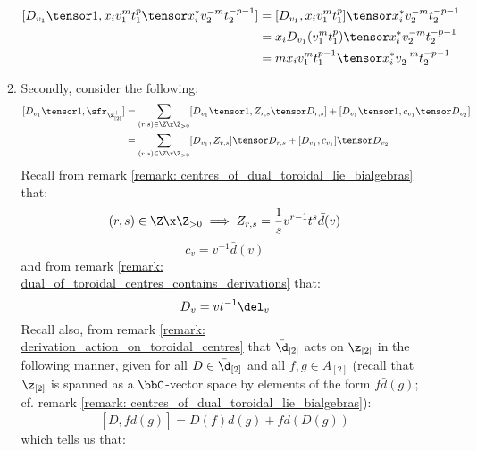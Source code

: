 \begin{enumerate}
\begin{enumerate}
$$\begin{aligned}
                                        [D_{v_1} \tensor 1, x_i v_1^m t_1^p \tensor x_i^* v_2^{-m} t_2^{-p - 1}] & = [D_{v_1}, x_i v_1^m t_1^p] \tensor x_i^* v_2^{-m} t_2^{-p - 1}
                                        \\
                                        & = x_i D_{v_1}(v_1^m t_1^p) \tensor x_i^* v_2^{-m} t_2^{-p - 1}
                                        \\
                                        & = m x_i v_1^m t_1^{p - 1} \tensor x_i^* v_2^{-m} t_2^{-p - 1}
                                    \end{aligned}
                                $$
                            \item Secondly, consider the following:
                                $$
                                    \begin{aligned}
                                        [D_{v_1} \tensor 1, \sfr_{\z_{[2]}^+}] & = \sum_{(r, s) \in \Z \x \Z_{> 0}} [D_{v_1} \tensor 1, Z_{r, s} \tensor D_{r, s}] + [D_{v_1} \tensor 1, c_{v_1} \tensor D_{v_2}]
                                        \\
                                        & = \sum_{(r, s) \in \Z \x \Z_{> 0}} [D_{v_1}, Z_{r, s}] \tensor D_{r, s} + [D_{v_1}, c_{v_1}] \tensor D_{v_2}
                                    \end{aligned}
                                $$
                            Recall from remark \ref{remark: centres_of_dual_toroidal_lie_bialgebras} that:
                                $$(r, s) \in \Z \x \Z_{> 0} \implies Z_{r, s} = \frac1s v^{r - 1} t^s \bar{d}(v)$$
                                $$c_v = v^{-1} \bar{d}(v)$$
                            and from remark \ref{remark: dual_of_toroidal_centres_contains_derivations} that:
                                $$D_v = v t^{-1} \del_v$$
                            Recall also, from remark \ref{remark: derivation_action_on_toroidal_centres} that $\bar{\d}_{[2]}$ acts on $\z_{[2]}$ in the following manner, given for all $D \in \bar{\d}_{[2]}$ and all $f, g \in A_{[2]}$ (recall that $\z_{[2]}$ is spanned as a $\bbC$-vector space by elements of the form $f \bar{d}(g)$; cf. remark \ref{remark: centres_of_dual_toroidal_lie_bialgebras}):
                                $$[D, f \bar{d}(g)] = D(f) \bar{d}(g) + f \bar{d}( D(g) )$$
                            which tells us that:
                                $$
                                    \begin{aligned}

\end{aligned}$$
\end{enumerate}
\end{enumerate}
